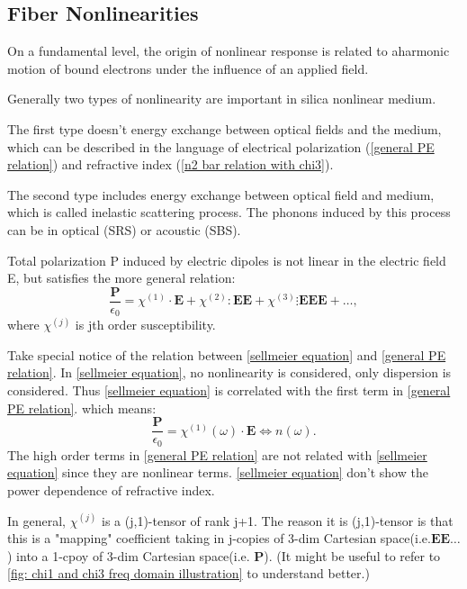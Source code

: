 \documentclass[12pt]{extarticle}
\numberwithin{equation}{section}
\numberwithin{figure}{section}
\numberwithin{table}{section}
\newcommand{\<}{\langle}
\renewcommand{\>}{\rangle}
\theoremstyle{definition}
\newcommand{\SubItem}[1]{
    {\setlength\itemindent{15pt} \item[-] #1}
}
\begin{document}
    \subsection{Fiber Nonlinearities}
        \begin{itemize}
            \item On a fundamental level, the origin of nonlinear response is related to aharmonic motion of bound electrons under the influence of an applied field.
            \item Generally two types of nonlinearity are important in silica nonlinear medium. 
                \SubItem{The first type doesn't energy exchange between optical fields and the medium, which can be described in the language of electrical polarization (\autoref{general PE relation}) and refractive index (\autoref{n2 bar relation with chi3}).}
                \SubItem{The second type includes energy exchange between optical field and medium, which is called inelastic scattering process. The phonons induced by this process can be in optical (SRS) or acoustic (SBS).}
            \item Total polarization P induced by electric dipoles is not linear in the electric field E, but satisfies the more general relation:
                \begin{equation}
                    \frac{\boldsymbol{P}}{\epsilon_0} = \chi^{(1)} \cdot \boldsymbol{E} + \chi^{(2)} : \boldsymbol{EE} + \chi^{(3)} \vdots \boldsymbol{EEE} + \dots,
                    \label{general PE relation}
                \end{equation}
                where $\chi^{(j)}$ is jth order susceptibility. 
                \SubItem{Take special notice of the relation between \autoref{sellmeier equation} and \autoref{general PE relation}. In \autoref{sellmeier equation}, no nonlinearity is considered, only dispersion is considered. Thus \autoref{sellmeier equation} is correlated with the first term in \autoref{general PE relation}. which means:
                    \begin{equation}
                        \frac{\boldsymbol{P}}{\epsilon_0} = \chi^{(1)}(\omega) \cdot \boldsymbol{E} \iff n(\omega).
                    \end{equation}
                    The high order terms in \autoref{general PE relation} are not related with \autoref{sellmeier equation} since they are nonlinear terms. \autoref{sellmeier equation} don't show the power dependence of refractive index.
                }
                \SubItem{In general, $\chi^{(j)}$ is a (j,1)-tensor\cite{noauthor_tensor_2019} of rank j+1. The reason it is (j,1)-tensor is that this is a "mapping" coefficient taking in j-copies of 3-dim Cartesian space(i.e.$\boldsymbol{EE\dots}$) into a 1-cpoy of 3-dim Cartesian space(i.e. $\boldsymbol{P}$). (It might be useful to refer to \autoref{fig: chi1 and chi3 freq domain illustration} to understand better.)}

\end{itemize}
\end{document}
